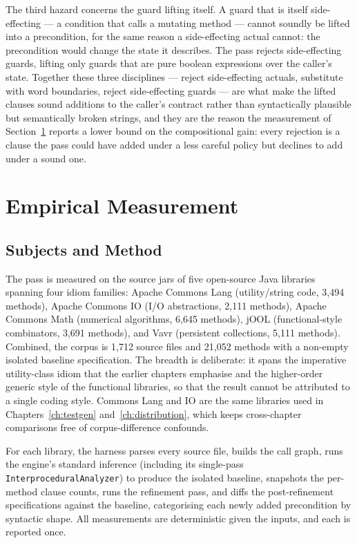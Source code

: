 The third hazard concerns the guard lifting itself. A guard that is itself
side-effecting --- a condition that calls a mutating method --- cannot soundly be
lifted into a precondition, for the same reason a side-effecting actual cannot:
the precondition would change the state it describes. The pass rejects
side-effecting guards, lifting only guards that are pure boolean expressions over
the caller's state. Together these three disciplines --- reject side-effecting
actuals, substitute with word boundaries, reject side-effecting guards --- are
what make the lifted clauses sound additions to the caller's contract rather than
syntactically plausible but semantically broken strings, and they are the reason
the measurement of Section~\ref{sec:comp-empirical} reports a lower bound on the
compositional gain: every rejection is a clause the pass could have added under a
less careful policy but declines to add under a sound one.

\section{Empirical Measurement}
\label{sec:comp-empirical}

\subsection{Subjects and Method}

The pass is measured on the source jars of five open-source Java libraries
spanning four idiom families: Apache Commons Lang (utility/string code, 3{,}494
methods), Apache Commons IO (I/O abstractions, 2{,}111 methods), Apache Commons
Math (numerical algorithms, 6{,}645 methods), jOOL (functional-style
combinators, 3{,}691 methods), and Vavr (persistent collections, 5{,}111
methods). Combined, the corpus is 1{,}712 source files and 21{,}052 methods with
a non-empty isolated baseline specification. The breadth is deliberate: it spans
the imperative utility-class idiom that the earlier chapters emphasise and the
higher-order generic style of the functional libraries, so that the result
cannot be attributed to a single coding style. Commons Lang and IO are the same
libraries used in Chapters~\ref{ch:testgen} and~\ref{ch:distribution}, which
keeps cross-chapter comparisons free of corpus-difference confounds.

For each library, the harness parses every source file, builds the call graph,
runs the engine's standard inference (including its single-pass
\texttt{InterproceduralAnalyzer}) to produce the isolated baseline, snapshots the
per-method clause counts, runs the refinement pass, and diffs the post-refinement
specifications against the baseline, categorising each newly added precondition
by syntactic shape. All measurements are deterministic given the inputs, and each
is reported once.

